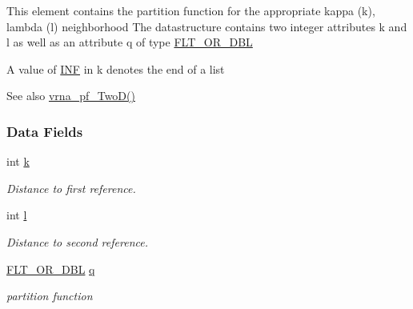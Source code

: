 This element contains the partition function for the appropriate kappa (k), lambda (l) neighborhood The datastructure contains two integer attributes \textquotesingle{}k\textquotesingle{} and \textquotesingle{}l\textquotesingle{} as well as an attribute \textquotesingle{}q\textquotesingle{} of type \hyperlink{group__data__structures_ga31125aeace516926bf7f251f759b6126}{F\+L\+T\+\_\+\+O\+R\+\_\+\+D\+BL}

A value of \hyperlink{energy__const_8h_a12c2040f25d8e3a7b9e1c2024c618cb6}{I\+NF} in k denotes the end of a list

\begin{DoxySeeAlso}{See also}
\hyperlink{group__kl__neighborhood__pf_ga0bc3427689bd09da09b8b3094a27f836}{vrna\+\_\+pf\+\_\+\+Two\+D()} 
\end{DoxySeeAlso}
\subsubsection*{Data Fields}
\begin{DoxyCompactItemize}
\item 
\mbox{\label{group__kl__neighborhood__pf_ad1f23b46dc4ebd373abdeb0382d87b83}} 
int \hyperlink{group__kl__neighborhood__pf_ad1f23b46dc4ebd373abdeb0382d87b83}{k}
\begin{DoxyCompactList}\small\item\em Distance to first reference. \end{DoxyCompactList}\item 
\mbox{\label{group__kl__neighborhood__pf_a01133c264eff2c988d144e07803d1b8b}} 
int \hyperlink{group__kl__neighborhood__pf_a01133c264eff2c988d144e07803d1b8b}{l}
\begin{DoxyCompactList}\small\item\em Distance to second reference. \end{DoxyCompactList}\item 
\mbox{\label{group__kl__neighborhood__pf_a17ebbf425b8769ded74b5c7b85e58ee1}} 
\hyperlink{group__data__structures_ga31125aeace516926bf7f251f759b6126}{F\+L\+T\+\_\+\+O\+R\+\_\+\+D\+BL} \hyperlink{group__kl__neighborhood__pf_a17ebbf425b8769ded74b5c7b85e58ee1}{q}
\begin{DoxyCompactList}\small\item\em partition function \end{DoxyCompactList}\end{DoxyCompactItemize}


